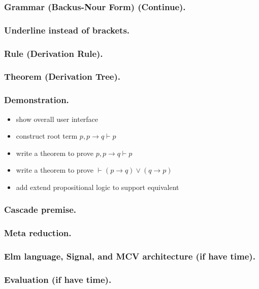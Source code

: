 \documentclass[notes]{beamer}
\begin{document}
\begin{frame}
\frametitle{Grammar (Backus-Nour Form) (Continue).}
\end{frame}

\begin{frame}
\frametitle{Underline instead of brackets.}
\end{frame}

\begin{frame}
\frametitle{Rule (Derivation Rule).}
\end{frame}

\begin{frame}
\frametitle{Theorem (Derivation Tree).}
\end{frame}

\begin{frame}
\frametitle{Demonstration.}

\begin{itemize}
\item show overall user interface
\item construct root term $p, p \rightarrow q \vdash p$
\item write a theorem to prove $p, p \rightarrow q \vdash p$
\item write a theorem to prove $\vdash (p \rightarrow q) \vee (q \rightarrow p)$
\item add extend propositional logic to support equivalent
\end{itemize}

\end{frame}

\begin{frame}
\frametitle{Cascade premise.}
\end{frame}

\begin{frame}
\frametitle{Meta reduction.}
\end{frame}

\begin{frame}
\frametitle{Elm language, Signal, and MCV architecture (if have time).}
\end{frame}

\begin{frame}
\frametitle{Evaluation (if have time).}
\end{frame}
\end{document}

